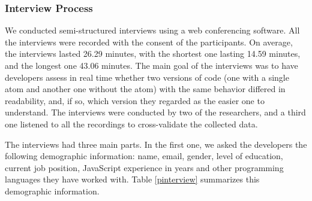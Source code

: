\subsubsection{Interview Process} We conducted semi-structured interviews using a web conferencing software. All the interviews were recorded with the consent of the participants. On average, the interviews lasted 26.29 minutes, with the shortest one lasting 14.59 minutes, and the longest one 43.06 minutes. The main goal of the interviews was to have developers assess in real time whether two versions of code (one with a single atom and another one without the atom) with the same behavior differed in readability, and, if so, which version they regarded as the easier one to understand. The interviews were conducted by two of the researchers, and a third one listened to all the recordings to cross-validate the collected data.


The interviews had three main parts. In the first one, we asked the developers the following demographic information: name, email, gender, level of education, current job position, JavaScript experience in years and other programming languages they have worked with.
Table \ref{pinterview} summarizes this demographic information.


